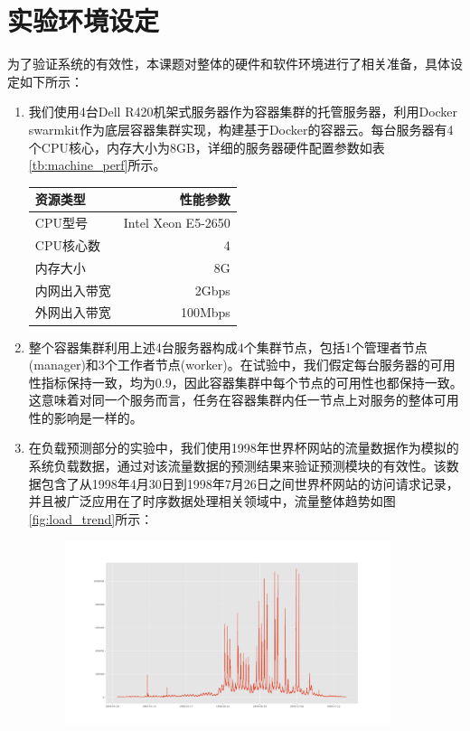 \section{实验环境设定}\label{sec:env_prep}
为了验证系统的有效性，本课题对整体的硬件和软件环境进行了相关准备，具体设定如下所示：
\begin{enumerate}
\item 我们使用4台Dell R420机架式服务器作为容器集群的托管服务器，利用Docker swarmkit作为底层容器集群实现，构建基于Docker的容器云。每台服务器有4个CPU核心，内存大小为8GB，详细的服务器硬件配置参数如表\ref{tb:machine_perf}所示。

\begin{table}[h]
\centering
{}
\begin{tabular}{@{}lr@{}} \toprule
 资源类型 & 性能参数 \\ \midrule
 CPU型号 & Intel Xeon E5-2650\\
 CPU核心数 & 4\\
 内存大小 & 8G\\
 内网出入带宽 & 2Gbps\\
 外网出入带宽 & 100Mbps\\ \bottomrule
\end{tabular}
\end{table}

\item 整个容器集群利用上述4台服务器构成4个集群节点，包括1个管理者节点(manager)和3个工作者节点(worker)。在试验中，我们假定每台服务器的可用性指标保持一致，均为0.9，因此容器集群中每个节点的可用性也都保持一致。这意味着对同一个服务而言，任务在容器集群内任一节点上对服务的整体可用性的影响是一样的。

\item 在负载预测部分的实验中，我们使用1998年世界杯网站的流量数据作为模拟的系统负载数据，通过对该流量数据的预测结果来验证预测模块的有效性。该数据包含了从1998年4月30日到1998年7月26日之间世界杯网站的访问请求记录，并且被广泛应用在了时序数据处理相关领域中，流量整体趋势如图\ref{fig:load_trend}所示：
\begin{figure}[htbp]
\centering
\includegraphics[width=0.9\textwidth]{./figure/alldata}
\end{figure}


\end{enumerate}
